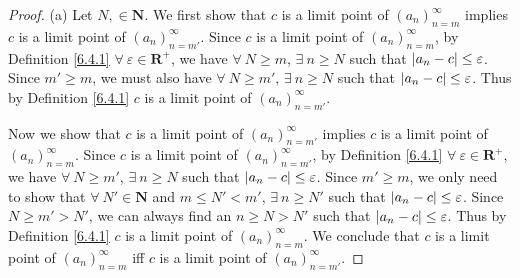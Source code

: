 \begin{proof}{(a)}
    Let \(N, \in \mathbf{N}\).
    We first show that \(c\) is a limit point of \((a_n)_{n = m}^\infty\) implies \(c\) is a limit point of \((a_n)_{n = m'}^\infty\).
    Since \(c\) is a limit point of \((a_n)_{n = m}^\infty\), by Definition \ref{6.4.1} \(\forall\ \varepsilon \in \mathbf{R}^+\), we have \(\forall\ N \geq m\), \(\exists\ n \geq N\) such that \(\abs*{a_n - c} \leq \varepsilon\).
    Since \(m' \geq m\), we must also have \(\forall\ N \geq m'\), \(\exists\ n \geq N\) such that \(\abs*{a_n - c} \leq \varepsilon\).
    Thus by Definition \ref{6.4.1} \(c\) is a limit point of \((a_n)_{n = m'}^\infty\).

    Now we show that \(c\) is a limit point of \((a_n)_{n = m'}^\infty\) implies \(c\) is a limit point of \((a_n)_{n = m}^\infty\).
    Since \(c\) is a limit point of \((a_n)_{n = m'}^\infty\), by Definition \ref{6.4.1} \(\forall\ \varepsilon \in \mathbf{R}^+\), we have \(\forall\ N \geq m'\), \(\exists\ n \geq N\) such that \(\abs*{a_n - c} \leq \varepsilon\).
    Since \(m' \geq m\), we only need to show that \(\forall\ N' \in \mathbf{N}\) and \(m \leq N' < m'\), \(\exists\ n \geq N'\) such that \(\abs*{a_n - c} \leq \varepsilon\).
    Since \(N \geq m' > N'\), we can always find an \(n \geq N > N'\) such that \(\abs*{a_n - c} \leq \varepsilon\).
    Thus by Definition \ref{6.4.1} \(c\) is a limit point of \((a_n)_{n = m}^\infty\).
    We conclude that \(c\) is a limit point of \((a_n)_{n = m}^\infty\) iff \(c\) is a limit point of \((a_n)_{n = m'}^\infty\).
\end{proof}

